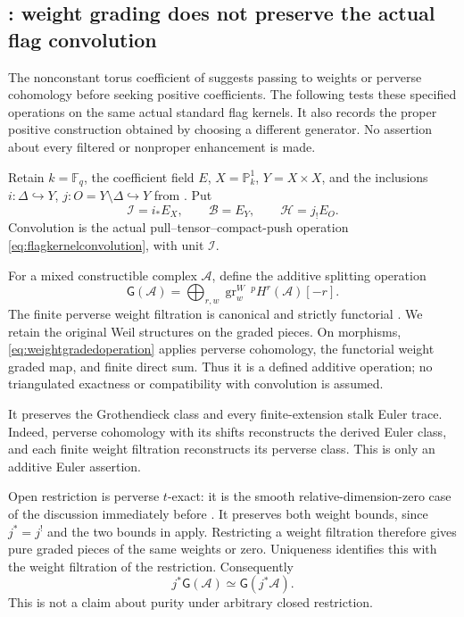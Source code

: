 \subsection{: weight grading does not preserve the actual flag convolution}
\label{sec:weightextraction}

The nonconstant torus coefficient of  suggests passing
to weights or perverse cohomology before seeking positive
coefficients. The following tests these specified operations on
the same actual standard flag kernels. It also records the
proper positive construction obtained by choosing a different
generator. No assertion about every filtered or nonproper
enhancement is made.

Retain \(k=\mathbb F_q\), the coefficient field \(E\),
\(X=\mathbb P^1_k\), \(Y=X\times X\), and the inclusions
\(i:\Delta\hookrightarrow Y\), \(j:O=Y\setminus\Delta
\hookrightarrow Y\) from . Put
\[
 \mathcal I=i_*E_X,\qquad
 \mathcal B=E_Y,\qquad
 \mathcal H=j_!E_O.
\]
Convolution is the actual pull--tensor--compact-push operation
\eqref{eq:flagkernelconvolution}, with unit \(\mathcal I\).

For a mixed constructible complex \(\mathcal A\), define
the additive splitting operation
\begin{equation}\label{eq:weightgradedoperation}
 \mathsf G(\mathcal A)=
 \bigoplus_{r,w}
       \operatorname{gr}^W_w\,{}^pH^r(\mathcal A)[-r].
\end{equation}
The finite perverse weight filtration is canonical and strictly
functorial \cite[Theorem~5.3.5 and its proof through
Lemma~5.3.6, pp.~136--137]{BBD}. We retain the original Weil
structures on the graded pieces. On morphisms,
\eqref{eq:weightgradedoperation} applies perverse cohomology,
the functorial weight graded map, and finite direct sum.
Thus it is a defined additive operation; no triangulated
exactness or compatibility with convolution is assumed.

It preserves the Grothendieck class and every finite-extension
stalk Euler trace. Indeed, perverse cohomology with its shifts
reconstructs the derived Euler class, and each finite weight
filtration reconstructs its perverse class. This is only an
additive Euler assertion.

Open restriction is perverse \(t\)-exact: it is the smooth
relative-dimension-zero case of the discussion immediately
before \cite[Proposition~4.2.5, pp.~108--109]{BBD}.
It preserves both weight bounds, since \(j^*=j^!\) and the two
bounds in \cite[5.1.14, p.~128]{BBD} apply. Restricting a
weight filtration therefore gives pure graded pieces of the
same weights or zero. Uniqueness identifies this with the
weight filtration of the restriction. Consequently
\begin{equation}\label{eq:weightgradedopenrestriction}
             j^*\mathsf G(\mathcal A)
                  \simeq\mathsf G(j^*\mathcal A).
\end{equation}
This is not a claim about purity under arbitrary closed
restriction.

